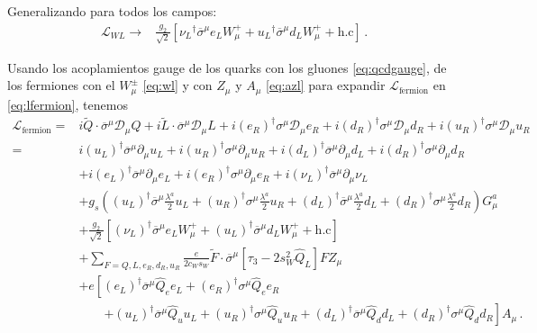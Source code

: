 \begin{frame}
Generalizando para todos los campos:
\begin{align}
  \label{eq:wl}
   \mathcal{L}_{W L}\to&\frac{g_2}{\sqrt{2}}\left[{\nu_L}^{\dagger}\overline{\sigma}^\mu e_LW_\mu^++
{u_L}^{\dagger}\overline{\sigma}^\mu d_LW_\mu^++\text{h.c}\right]\,.
\end{align}



Usando los acoplamientos gauge de los quarks con los gluones \eqref{eq:qcdgauge}, de los fermiones con el $W_\mu^\pm$  \eqref{eq:wl} y  con $Z_\mu$ y $A_\mu$ \eqref{eq:azl} para expandir $\mathcal{L}_{\text{fermion}}$ en \eqref{eq:lfermion}, tenemos
\begin{align}
\label{eq:sm1g2}
 \mathcal{L}_{\text{fermion}}=&i \widetilde{Q}\cdot \overline{\sigma}^\mu\mathcal{D}_\mu Q+i \widetilde{L}\cdot\overline{\sigma}^\mu\mathcal{D}_\mu L+
i\left(e_R \right)^{\dagger}\sigma^\mu\mathcal{D}_\mu {e_R}+i(d_R)^\dagger \sigma^\mu\mathcal{D}_\mu {d_R}+i(u_R)^\dagger \sigma^\mu\mathcal{D}_\mu {u_R}\nonumber\\
  =&i(u_L)^\dagger \overline{\sigma}^\mu\partial_\mu u_L+i(u_R)^\dagger \sigma^\mu{\partial}_\mu {u_R}+i(d_L)^\dagger \overline{\sigma}^\mu\partial_\mu d_L+i(d_R)^\dagger \sigma^\mu{\partial}_\mu {d_R}\nonumber\\
&+i(e_L)^\dagger \overline{\sigma}^\mu{\partial}_\mu e_L
+i\left(e_R \right)^{\dagger}\sigma^\mu{\partial}_\mu {e_R}+i(\nu_L)^\dagger \overline{\sigma}^\mu{\partial}_\mu \nu_L\nonumber\\
&+g_s \left((u_L)^\dagger \overline{\sigma}^\mu\frac{\lambda^a}{2}u_L+(u_R)^\dagger {\sigma}^{\mu}\frac{\lambda^a}{2}u_R
+(d_L)^\dagger \overline{\sigma}^{\mu}\frac{\lambda^a}{2}d_L+ (d_R)^\dagger \sigma^{\mu}\frac{\lambda^a}{2}d_R\right)G_{\mu}^a\nonumber\\
&+\frac{g_2}{\sqrt{2}}\left[(\nu_L)^\dagger \overline{\sigma}^\mu e_LW_\mu^++
(u_L)^\dagger \overline{\sigma}^\mu d_LW_\mu^++\text{h.c}\right]\nonumber\\
&+\sum_{F=Q,L,e_R,d_R,u_R}\frac{e}{2c_W s_W}\widetilde{F}\cdot\overline{\sigma}^\mu\left[ \tau_3-2s_W^2\widehat{Q}_L\right]F Z_\mu\nonumber\\
&+e\left[(e_L)^\dagger \overline{\sigma}^\mu \widehat{Q}_e e_L+\left(e_R \right)^{\dagger}\sigma^\mu \widehat{Q}_e e_R\right.\nonumber\\
  &\qquad\left.+(u_L)^\dagger \overline{\sigma}^\mu \widehat{Q}_u u_L+(u_R)^\dagger {\sigma}^\mu \widehat{Q}_u u_R
+(d_L)^\dagger \overline{\sigma}^\mu \widehat{Q}_d d_L+(d_R)^\dagger \sigma^\mu \widehat{Q}_d d_R\right] A_\mu\,.
\end{align}
\end{frame}








